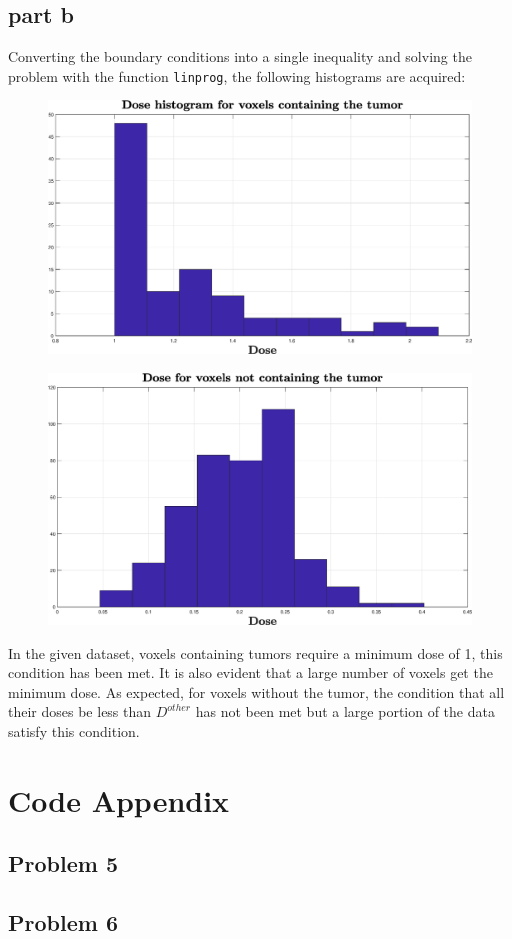 \documentclass[a4paper]{article}
\begin{document}
\begin{Large}
	\subsection*{part b}
	Converting the boundary conditions into a single 	inequality and solving the problem with the function \texttt{linprog}, the following histograms are acquired:
	\begin{figure}[h!]
		\begin{center}
			\includegraphics[scale=.45]{tumordose}
		\end{center}
	\end{figure}
	\begin{figure}[h!]
	\begin{center}
		\includegraphics[scale=.45]{nontumordose}
	\end{center}
	\end{figure}	
	In the given dataset, voxels containing tumors require a minimum dose of 1, this condition has been met. It is also evident that a large number of voxels get the minimum dose. As expected, for voxels without the tumor, the condition that all their doses be less than $ D^{other} $ has not been met but a large portion of the data satisfy this condition.
\newpage
\section*{Code Appendix}
\subsection*{Problem 5}	

\newpage
\subsection*{Problem 6}

	
\end{Large}
\end{document}
